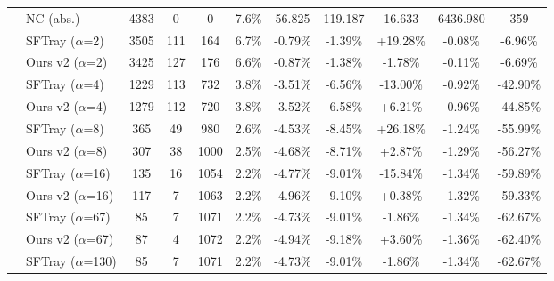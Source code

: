 \begin{table}[t]
{\begin{tabular}{ll|cccc|ccc|cc}
\addlinespace[0.3em]

\midrule

\multirow{25}{*}{jpeg} & NC (abs.) & 4383 & 0 & 0 & 7.6\% & 56.825 & 119.187 & 16.633 & 6436.980 & 359 \\

\addlinespace[0.4em]

 & SFTray ($\alpha$=2) & 3505 & 111 & 164 & 6.7\% & -0.79\% & -1.39\% & +19.28\% & -0.08\% & -6.96\% \\

 & Ours v2 ($\alpha$=2) & 3425 & 127 & 176 & 6.6\% & -0.87\% & -1.38\% & -1.78\% & -0.11\% & -6.69\% \\

\addlinespace[0.3em]

 & SFTray ($\alpha$=4) & 1229 & 113 & 732 & 3.8\% & -3.51\% & -6.56\% & -13.00\% & -0.92\% & -42.90\% \\

 & Ours v2 ($\alpha$=4) & 1279 & 112 & 720 & 3.8\% & -3.52\% & -6.58\% & +6.21\% & -0.96\% & -44.85\% \\

\addlinespace[0.3em]

 & SFTray ($\alpha$=8) & 365 & 49 & 980 & 2.6\% & -4.53\% & -8.45\% & +26.18\% & -1.24\% & -55.99\% \\

 & Ours v2 ($\alpha$=8) & 307 & 38 & 1000 & 2.5\% & -4.68\% & -8.71\% & +2.87\% & -1.29\% & -56.27\% \\

\addlinespace[0.3em]

 & SFTray ($\alpha$=16) & 135 & 16 & 1054 & 2.2\% & -4.77\% & -9.01\% & -15.84\% & -1.34\% & -59.89\% \\

 & Ours v2 ($\alpha$=16) & 117 & 7 & 1063 & 2.2\% & -4.96\% & -9.10\% & +0.38\% & -1.32\% & -59.33\% \\

\addlinespace[0.3em]

 & SFTray ($\alpha$=67) & 85 & 7 & 1071 & 2.2\% & -4.73\% & -9.01\% & -1.86\% & -1.34\% & -62.67\% \\

 & Ours v2 ($\alpha$=67) & 87 & 4 & 1072 & 2.2\% & -4.94\% & -9.18\% & +3.60\% & -1.36\% & -62.40\% \\

\addlinespace[0.3em]

 & SFTray ($\alpha$=130) & 85 & 7 & 1071 & 2.2\% & -4.73\% & -9.01\% & -1.86\% & -1.34\% & -62.67\% \\


\end{tabular}}
\end{table}
